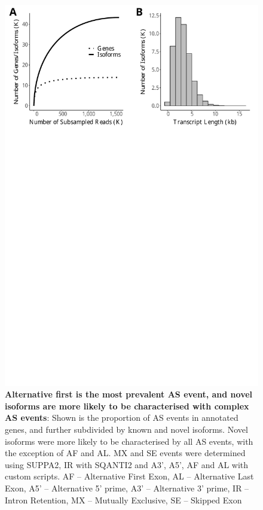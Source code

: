 \begin{figure}[htp]
	\begin{center}
		\includegraphics[page=8,trim={0 19cm 0 2cm},clip,scale = 0.55]{Figures/IsoSeqWholeTranscriptome.pdf}
	\end{center}
	\captionsetup{width=0.95\textwidth}
	\caption[Number of Alternative Splicing Events in Whole Transcriptome Iso-Seq]%
	{\textbf{Alternative first is the most prevalent AS event, and novel isoforms are more likely to be characterised with complex AS events}: Shown is the proportion of AS events in annotated genes, and further subdivided by known and novel isoforms. Novel isoforms were more likely to be characterised by all AS events, with the exception of AF and AL. MX and SE events were determined using SUPPA2, IR with SQANTI2 and A3’, A5’, AF and AL with custom scripts. AF – Alternative First Exon, AL – Alternative Last Exon, A5’ – Alternative 5’ prime, A3’ – Alternative 3’ prime, IR – Intron Retention, MX – Mutually Exclusive, SE – Skipped Exon}
	\label{fig:isoseq_whole_As_events}
\end{figure}

